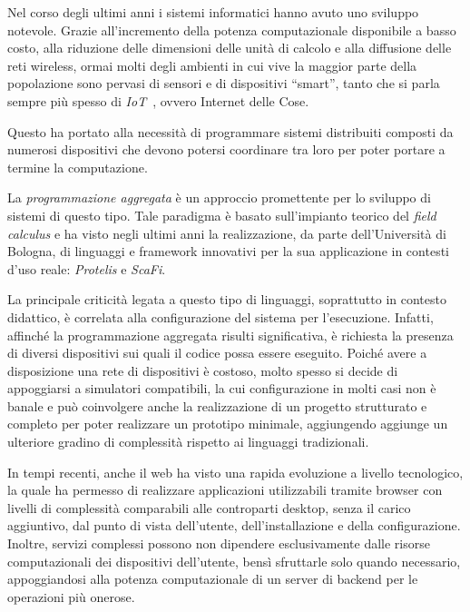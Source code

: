 \label{ch:intro}

Nel corso degli ultimi anni i sistemi informatici hanno avuto uno sviluppo notevole.
Grazie all'incremento della potenza computazionale disponibile a basso costo, alla riduzione delle dimensioni delle unità di calcolo e alla diffusione delle reti wireless,
ormai molti degli ambienti in cui vive la maggior parte della popolazione sono pervasi di sensori e di dispositivi ``smart'', tanto che si parla sempre più spesso di \emph{IoT}~\cite{ashton2009internet}, ovvero Internet delle Cose.

Questo ha portato alla necessità di programmare sistemi distribuiti composti da numerosi dispositivi che devono potersi coordinare tra loro
per poter portare a termine la computazione.

La \emph{programmazione aggregata} è un approccio promettente per lo sviluppo di sistemi di questo tipo.
Tale paradigma è basato sull'impianto teorico del \emph{field calculus} e ha visto negli ultimi anni la realizzazione,
da parte dell'Università di Bologna, di linguaggi e framework innovativi per la sua applicazione in contesti d'uso reale:
\emph{Protelis} e \emph{ScaFi}.

La principale criticità legata a questo tipo di linguaggi, soprattutto in contesto didattico, è correlata alla configurazione del sistema per l'esecuzione.
Infatti, affinché la programmazione aggregata risulti significativa, è richiesta la presenza di diversi dispositivi sui quali il codice possa essere eseguito.
Poiché avere a disposizione una rete di dispositivi è costoso, molto spesso si decide di appoggiarsi a simulatori compatibili,
la cui configurazione in molti casi non è banale e può coinvolgere anche la realizzazione di un progetto strutturato e completo per poter realizzare un prototipo minimale,
aggiungendo aggiunge un ulteriore gradino di complessità rispetto ai linguaggi tradizionali.

In tempi recenti, anche il web ha visto una rapida evoluzione a livello tecnologico,
la quale ha permesso di realizzare applicazioni utilizzabili tramite browser con livelli di complessità comparabili alle controparti desktop,
senza il carico aggiuntivo, dal punto di vista dell'utente, dell'installazione e della configurazione.
Inoltre, servizi complessi possono non dipendere esclusivamente dalle risorse computazionali dei dispositivi dell'utente,
bensì sfruttarle solo quando necessario, appoggiandosi alla potenza computazionale di un server di backend per le operazioni più onerose.

